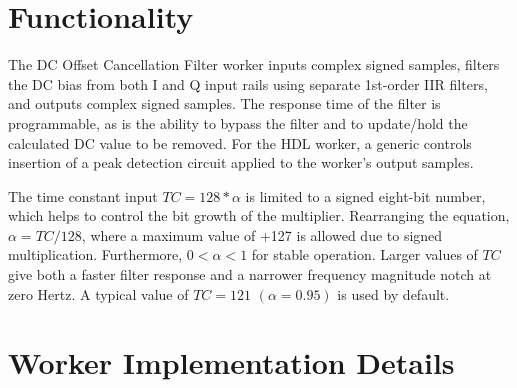 \documentclass{article}
\begin{document}
\section*{Functionality}
\begin{flushleft}
	The DC Offset Cancellation Filter worker inputs complex signed samples, filters the DC bias from both I and Q input rails using separate 1st-order IIR filters, and outputs complex signed samples. The response time of the filter is programmable, as is the ability to bypass the filter and to update/hold the calculated DC value to be removed. For the HDL worker, a generic controls insertion of a peak detection circuit applied to the worker's output samples.\medskip

	The time constant input $TC = 128*\alpha$ is limited to a signed eight-bit number, which helps to control the bit growth of the multiplier. Rearranging the equation, $\alpha = TC/128$, where a maximum value of +127 is allowed due to signed multiplication. Furthermore, $0<\alpha<1$ for stable operation. Larger values of $TC$ give both a faster filter response and a narrower frequency magnitude notch at zero Hertz. A typical value of $TC = 121$ $(\alpha = 0.95)$ is used by default.
\end{flushleft}

\section*{Worker Implementation Details}
\end{document}
